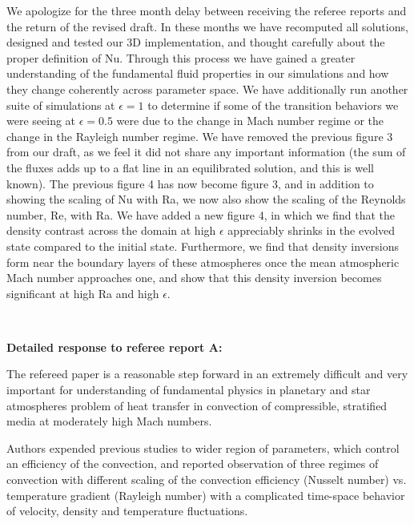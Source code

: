 \documentclass[aps, 11pt, singlecolumn]{revtex4-1} %
\begin{document}
\begin{singlespace}
We apologize for the three month delay between receiving the referee reports
and the return of the revised draft.  In these months we have
recomputed all solutions, designed and tested our 3D implementation, and
thought carefully about the proper definition of Nu.  Through this
process we have gained a greater understanding of the fundamental
fluid properties in our simulations and how they change coherently
across parameter space.  We have additionally run another suite of
simulations at $\epsilon = 1$ to determine if some of the transition behaviors we
were seeing at $\epsilon = 0.5$ were due to the change in Mach number regime
or the change in the Rayleigh number regime. 
We have removed the previous figure 3 from our
draft, as we feel it did not share any important information (the sum of
the fluxes adds up to a flat line in an equilibrated solution, and this
is well known).  The previous figure 4 has now become figure 3, and in addition
to showing the scaling of Nu with Ra, we now also show the scaling of the
Reynolds number, Re, with Ra.  We have added a new figure 4, in which we
find that the density contrast across the domain at high $\epsilon$ appreciably
shrinks in the evolved state compared to the initial state.  Furthermore, we
find that density inversions form near the boundary layers of these atmospheres
once the mean atmospheric Mach number approaches one, and show that this density
inversion becomes significant at high Ra and high $\epsilon$.

$\,$
\newline
$\,$
\newline

\textbf{Detailed response to referee report A:}

\begin{myquotation}
The refereed paper is a reasonable step forward in an extremely
difficult and very important for understanding of fundamental physics
in planetary and star atmospheres problem of heat transfer in
convection of compressible, stratified media at moderately high Mach
numbers.

Authors expended previous studies to wider region of parameters, which
control an efficiency of the convection, and reported observation of
three regimes of convection with different scaling of the convection
efficiency (Nusselt number) vs. temperature gradient (Rayleigh number)
with a complicated time-space behavior of velocity, density and
temperature fluctuations.


\end{myquotation}
\end{singlespace}
\end{document}

